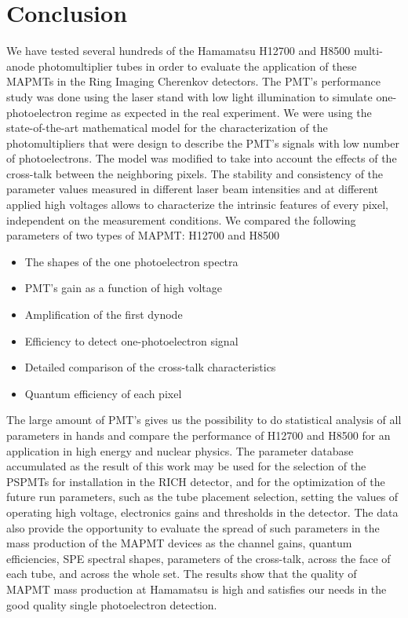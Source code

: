 \section{Conclusion}
We have tested several hundreds of the Hamamatsu H12700 and H8500 multi-anode photomultiplier tubes in order to evaluate the application of these MAPMTs in the Ring Imaging Cherenkov detectors. The PMT’s performance study was done using the laser stand with low light illumination to simulate one-photoelectron regime as expected in the real experiment. We were using the state-of-the-art mathematical model for the characterization of the photomultipliers that were design to describe the PMT’s signals with low number of photoelectrons. The model was modified to take into account the effects of the cross-talk between the neighboring pixels. The stability and consistency of the parameter values measured in different laser beam intensities and at different applied high voltages allows to characterize the intrinsic features of every pixel, independent on the measurement conditions. 
We compared the following parameters of two types of MAPMT: H12700 and H8500
\begin{itemize}
\item The shapes of the one photoelectron spectra
\item PMT's gain as a function of high voltage
\item Amplification of the first dynode
\item Efficiency to detect one-photoelectron signal
\item Detailed comparison of the cross-talk characteristics
\item Quantum efficiency of each pixel
\end{itemize}
The large amount of PMT’s gives us the possibility to do statistical analysis of all parameters in hands and compare the performance of H12700 and H8500 for an application in high energy and nuclear physics. The parameter database accumulated as the result of this work may be used for the selection of the PSPMTs for installation in the RICH detector, and for the optimization of the future run parameters, such as the tube placement selection, setting the values of operating high voltage, electronics gains and thresholds in the detector. The data also provide the opportunity to evaluate the spread of such parameters in the mass production of the MAPMT devices as the channel gains, quantum efficiencies, SPE spectral shapes, parameters of the cross-talk, across the face of each tube, and across the whole set. The results show that the quality of MAPMT mass production at Hamamatsu is high and satisfies our needs in the good quality single photoelectron detection.
 
